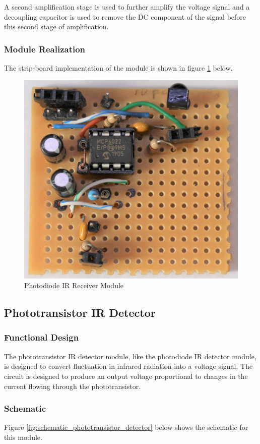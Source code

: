 A second amplification stage is used to further amplify the voltage signal and a decoupling capacitor is used to remove the DC component of the signal before this second stage of amplification.


\subsubsection{Module Realization}
The strip-board implementation of the module is shown in figure \ref{fig:module_photodiode_receiver} below.

\begin{figure}[H]
	\centering
	\includegraphics[width=.6\textwidth]{figures/modules/photodiode_receiver.jpg}
	\caption{Photodiode IR Receiver Module}
	\label{fig:module_photodiode_receiver}
\end{figure}





\subsection{Phototransistor IR Detector}

\subsubsection{Functional Design}
The phototransistor IR detector module, like the photodiode IR detector module, is designed to convert fluctuation in infrared radiation into a voltage signal. The circuit is designed to produce an output voltage proportional to changes in the current flowing through the phototransistor.

\subsubsection{Schematic}
Figure \ref{fig:schematic_phototransistor_detector} below shows the schematic for this module.

